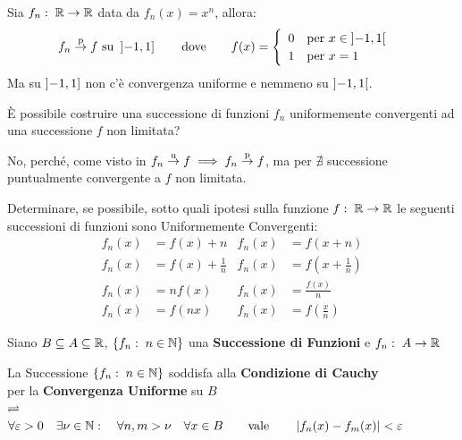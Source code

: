 \begin{example}
	\label{ex:conv_punt_nimplies_conv_unif}
	Sia $f_n:\; \mathbb{R} \to \mathbb{R}$ data da $f_n(x) = x^n$, allora:
	\[
		f_n \overset{\text{p}}{\to} f \text{ su } \left]-1,1\right]
		\qquad \text{dove} \qquad
		f(x) = \begin{cases}
			\begin{array}{ll}
				0 & \text{per } x \in \left]-1,1\right[\\
				1 & \text{per } x = 1
			\end{array}
		\end{cases}
	\]
	Ma su $\left]-1,1\right]$ non c'è convergenza uniforme e nemmeno su $\left]-1,1\right[$.
\end{example}
\begin{exercise}
	È possibile costruire una successione di funzioni $f_n$ uniformemente convergenti ad una successione $f$ non limitata?
	\begin{solution}
		No, perché, come visto in  $f_n \overset{\text{u}}{\to} f \implies f_n \overset{\text{p}}{\to} f$, ma per  $\nexists$ successione puntualmente convergente a $f$ non limitata.
	\end{solution}
\end{exercise}
\begin{exercise}
	Determinare, se possibile, sotto quali ipotesi sulla funzione $f:\; \mathbb{R} \to \mathbb{R}$ le seguenti successioni di funzioni sono Uniformemente Convergenti:
	\begin{align*}
		f_n(x) &= f(x) + n & f_n(x) &= f(x + n)\\
		f_n(x) &= f(x) + \frac{1}{n} & f_n(x) &= f(x + \frac{1}{n})\\
		f_n(x) &= nf(x) & f_n(x) &= \frac{f(x)}{n}\\
		f_n(x) &= f(nx) & f_n(x) &= f(\frac{x}{n})
	\end{align*}
\end{exercise}
\begin{definition}
	\label{def:succ_funz_cau}
	Siano $B \subseteq A \subseteq \mathbb{R}$, $\left\{f_n:\; n \in \mathbb{N}\right\}$ una \textbf{Successione di Funzioni} e $f_n:\; A \to \mathbb{R}$
	\begin{center}
		La Successione $\left\{f_n:\; n \in \mathbb{N}\right\}$ soddisfa alla \textbf{Condizione di Cauchy}\\
		per la \textbf{Convergenza Uniforme} su $B$\\
		$\rightleftharpoons$\\
		$
			\forall \varepsilon > 0 \quad \exists \nu \in \N: \quad \forall n, m > \nu \quad \forall x \in B %
			\qquad \text{vale} \qquad \abs{f_n(x) - f_m(x)} < \varepsilon
		$
	\end{center}
\end{definition}
